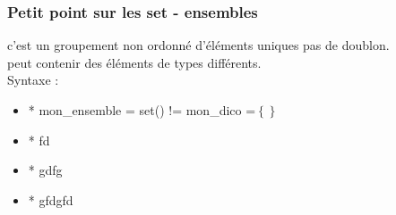 \begin{frame}
  \frametitle{Petit point sur les set - ensembles}
   c'est un groupement non ordonné d’éléments uniques  pas de doublon.\\
   peut contenir des éléments de types différents.\\
  
  Syntaxe :
  
  \begin{itemize}
\item*  mon\_ensemble = set() != mon\_dico =$\left\{\right\}$
\item* fd
\item* gdfg
\item* gfdgfd
\end{itemize}
\end{frame}

\begin{frame}
  
\end{frame}






